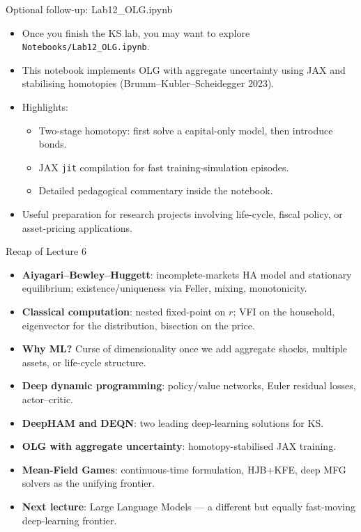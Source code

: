 \documentclass[10pt,english,aspectratio=169]{beamer}
\begin{document}
\begin{frame}{Optional follow-up: Lab12\_OLG.ipynb}
\begin{itemize}
\item Once you finish the KS lab, you may want to explore \texttt{Notebooks/Lab12\_OLG.ipynb}.
\medskip
\item This notebook implements OLG with aggregate uncertainty using JAX and stabilising homotopies (Brumm--Kubler--Scheidegger 2023).
\medskip
\item Highlights:
  \begin{itemize}
  \item Two-stage homotopy: first solve a capital-only model, then introduce bonds.
  \item JAX \texttt{jit} compilation for fast training-simulation episodes.
  \item Detailed pedagogical commentary inside the notebook.
  \end{itemize}
\medskip
\item Useful preparation for research projects involving life-cycle, fiscal policy, or asset-pricing applications.
\end{itemize}
\end{frame}

\begin{frame}{Recap of Lecture 6}
\begin{itemize}
\item \textbf{Aiyagari--Bewley--Huggett}: incomplete-markets HA model and stationary equilibrium; existence/uniqueness via Feller, mixing, monotonicity.
\medskip
\item \textbf{Classical computation}: nested fixed-point on $r$; VFI on the household, eigenvector for the distribution, bisection on the price.
\medskip
\item \textbf{Why ML?} Curse of dimensionality once we add aggregate shocks, multiple assets, or life-cycle structure.
\medskip
\item \textbf{Deep dynamic programming}: policy/value networks, Euler residual losses, actor--critic.
\medskip
\item \textbf{DeepHAM and DEQN}: two leading deep-learning solutions for KS.
\medskip
\item \textbf{OLG with aggregate uncertainty}: homotopy-stabilised JAX training.
\medskip
\item \textbf{Mean-Field Games}: continuous-time formulation, HJB+KFE, deep MFG solvers as the unifying frontier.
\medskip
\item \textbf{Next lecture}: Large Language Models --- a different but equally fast-moving deep-learning frontier.
\end{itemize}
\end{frame}
\end{document}
